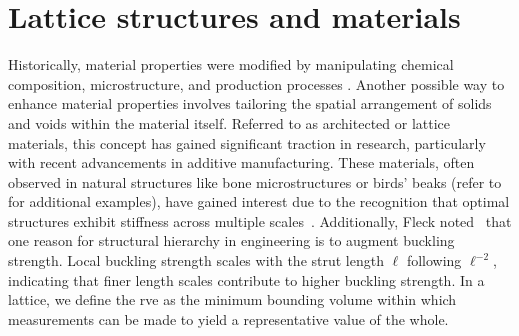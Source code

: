 \section{Lattice structures and materials}
Historically, material properties were modified by manipulating chemical composition, microstructure, and production processes . Another possible way to enhance material properties involves tailoring the spatial arrangement of solids and voids within the material itself. Referred to as architected or lattice materials, this concept has gained significant traction in research, particularly with recent advancements in additive manufacturing. These materials, often observed in natural structures like bone microstructures or birds' beaks (refer to  for additional examples), have gained interest due to the recognition that optimal structures exhibit stiffness across multiple scales~. Additionally, Fleck \etal noted~ that one reason for structural hierarchy in engineering is to augment buckling strength. Local buckling strength scales with the strut length $\ell$ following $\ell^{-2}$, indicating that finer length scales contribute to higher buckling strength. In a lattice, we define the \gls{rve} as the minimum bounding volume within which measurements can be made to yield a representative value of the whole. 
